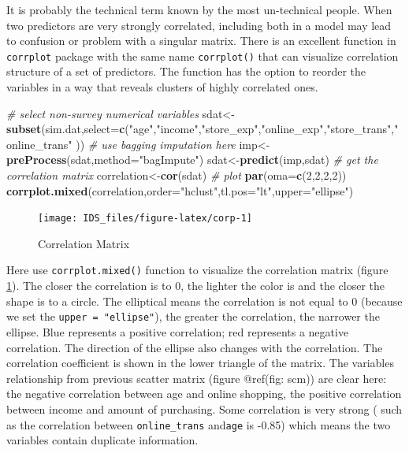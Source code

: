 \documentclass[12pt,]{krantz}
\newenvironment{Shaded}{\begin{snugshade}}{\end{snugshade}}
\newcommand{\KeywordTok}[1]{\textcolor[rgb]{0.13,0.29,0.53}{\textbf{{#1}}}}
\newcommand{\DataTypeTok}[1]{\textcolor[rgb]{0.13,0.29,0.53}{{#1}}}
\newcommand{\DecValTok}[1]{\textcolor[rgb]{0.00,0.00,0.81}{{#1}}}
\newcommand{\StringTok}[1]{\textcolor[rgb]{0.31,0.60,0.02}{{#1}}}
\newcommand{\CommentTok}[1]{\textcolor[rgb]{0.56,0.35,0.01}{\textit{{#1}}}}
\newcommand{\NormalTok}[1]{{#1}}
\theoremstyle{definition}
\theoremstyle{definition}
\theoremstyle{remark}
\begin{document}
It is probably the technical term known by the most un-technical people.
When two predictors are very strongly correlated, including both in a
model may lead to confusion or problem with a singular matrix. There is
an excellent function in \texttt{corrplot} package with the same name
\texttt{corrplot()} that can visualize correlation structure of a set of
predictors. The function has the option to reorder the variables in a
way that reveals clusters of highly correlated ones.

\begin{Shaded}
\begin{Highlighting}[]
\CommentTok{# select non-survey numerical variables}
\NormalTok{sdat<-}\KeywordTok{subset}\NormalTok{(sim.dat,}\DataTypeTok{select=}\KeywordTok{c}\NormalTok{(}\StringTok{"age"}\NormalTok{,}\StringTok{"income"}\NormalTok{,}\StringTok{"store_exp"}\NormalTok{,}\StringTok{"online_exp"}\NormalTok{,}\StringTok{"store_trans"}\NormalTok{,}\StringTok{"online_trans"} \NormalTok{))}
\CommentTok{# use bagging imputation here}
\NormalTok{imp<-}\KeywordTok{preProcess}\NormalTok{(sdat,}\DataTypeTok{method=}\StringTok{"bagImpute"}\NormalTok{)}
\NormalTok{sdat<-}\KeywordTok{predict}\NormalTok{(imp,sdat)}
\CommentTok{# get the correlation matrix}
\NormalTok{correlation<-}\KeywordTok{cor}\NormalTok{(sdat)}
\CommentTok{# plot }
\KeywordTok{par}\NormalTok{(}\DataTypeTok{oma=}\KeywordTok{c}\NormalTok{(}\DecValTok{2}\NormalTok{,}\DecValTok{2}\NormalTok{,}\DecValTok{2}\NormalTok{,}\DecValTok{2}\NormalTok{))}
\KeywordTok{corrplot.mixed}\NormalTok{(correlation,}\DataTypeTok{order=}\StringTok{"hclust"}\NormalTok{,}\DataTypeTok{tl.pos=}\StringTok{"lt"}\NormalTok{,}\DataTypeTok{upper=}\StringTok{"ellipse"}\NormalTok{)}
\end{Highlighting}
\end{Shaded}

\begin{figure}

{\centering \texttt{[image: IDS\_files/figure-latex/corp-1]} 

}

\caption{Correlation Matrix}\label{fig:corp}
\end{figure}

Here use \texttt{corrplot.mixed()} function to visualize the correlation
matrix (figure \ref{fig:corp}). The closer the correlation is to 0, the
lighter the color is and the closer the shape is to a circle. The
elliptical means the correlation is not equal to 0 (because we set the
\texttt{upper\ =\ "ellipse"}), the greater the correlation, the narrower
the ellipse. Blue represents a positive correlation; red represents a
negative correlation. The direction of the ellipse also changes with the
correlation. The correlation coefficient is shown in the lower triangle
of the matrix. The variables relationship from previous scatter matrix
(figure @ref(fig: scm)) are clear here: the negative correlation between
age and online shopping, the positive correlation between income and
amount of purchasing. Some correlation is very strong ( such as the
correlation between \texttt{online\_trans} and\texttt{age} is -0.85)
which means the two variables contain duplicate information.
\end{document}
